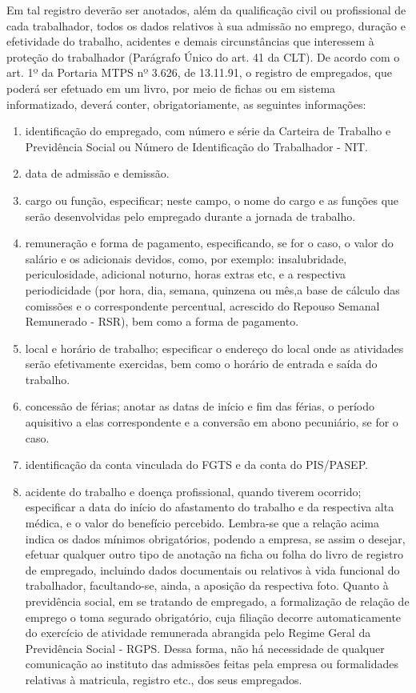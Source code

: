 \documentclass{article}
\begin{document}
Em tal registro deverão ser anotados, além da qualificação civil ou profissional de cada trabalhador, todos os dados relativos à sua admissão no emprego, duração e efetividade do trabalho, acidentes e demais circunstâncias que interessem à proteção do trabalhador (Parágrafo Único do art. 41 da CLT). De acordo com o art. 1º da Portaria MTPS nº 3.626, de 13.11.91, o registro de empregados, que poderá ser efetuado em um livro, por meio de fichas ou em sistema informatizado, deverá conter, obrigatoriamente, as seguintes informações:
\begin{enumerate}[label*=\roman*.]
  \item identificação do empregado, com número e série da Carteira de Trabalho e Previdência Social ou Número de Identificação do Trabalhador - NIT.
  \item data de admissão e demissão.
  \item cargo ou função, especificar; neste campo, o nome do cargo e as funções que serão desenvolvidas pelo empregado durante a jornada de trabalho.
  \item remuneração e forma de pagamento, especificando, se for o caso, o valor do salário e os adicionais devidos, como, por exemplo: insalubridade, periculosidade, adicional noturno, horas extras etc, e a respectiva periodicidade (por hora, dia, semana, quinzena ou mês,a base de cálculo das comissões e o correspondente percentual, acrescido do Repouso Semanal Remunerado - RSR), bem como a forma de pagamento.
  \item local e horário de trabalho; especificar o endereço do local onde as atividades serão efetivamente exercidas, bem como o horário de entrada e saída do trabalho.
  \item concessão de férias; anotar as datas de início e fim das férias, o período aquisitivo a elas correspondente e a conversão em abono pecuniário, se for o caso.
  \item identificação da conta vinculada do FGTS e da conta do PIS/PASEP.
  \item acidente do trabalho e doença profissional, quando tiverem ocorrido; especificar a data do início do afastamento do trabalho e da respectiva alta médica, e o valor do benefício percebido. 
  Lembra-se que a relação acima indica os dados mínimos obrigatórios, podendo a empresa, se assim o desejar, efetuar qualquer outro tipo de anotação na ficha ou folha do livro de registro de empregado, incluindo dados documentais ou relativos à vida funcional do trabalhador, facultando-se, ainda, a aposição da respectiva foto. 
  Quanto à previdência social, em se tratando de empregado, a formalização de relação de emprego o toma segurado obrigatório, cuja filiação decorre automaticamente do exercício de atividade remunerada abrangida pelo Regime Geral da Previdência Social - RGPS. 
  Dessa forma, não há necessidade de qualquer comunicação ao instituto das admissões feitas pela empresa ou formalidades relativas à matricula, registro etc., dos seus empregados.
\end{enumerate}
\end{document}
